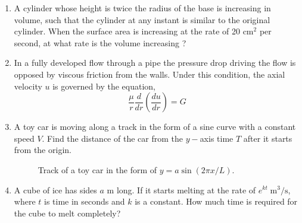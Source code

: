 \documentclass[a4paper,12pt]{article}
\begin{document}
\begin{enumerate}
 \item A cylinder whose height is twice the radius of the base is increasing in volume, such that the cylinder at any instant is similar to the original cylinder. When the surface area is increasing at the rate of 20 cm$^2$ per second, at what rate is the volume increasing ?
 \item In a fully developed flow through a pipe the pressure drop driving the flow is opposed by viscous friction from the walls. Under this condition, the axial velocity $u$ is governed by the equation,
   \[\frac{\mu}{r} \frac{d}{dr} \left( \frac{du}{dr}\right) = G\]
  
  \item A toy car is moving along a track in the form of a sine curve with a constant speed $V$. Find the distance of the car from the $y-$axis time $T$ after it starts from the origin.
  
 \begin{figure}[h]
 \begin{center}
\end{center}
 \caption{Track of a toy car in the form of $y = a\sin (2\pi x/L)$.}
\end{figure}

\item A cube of ice has sides $a$ m long. If it starts melting at the rate of  $e^{kt}\;\text{m}^3/\text{s}$, where $t$ is time in seconds and $k$ is a constant. How much time is required for the cube to melt completely?
\end{enumerate}
\end{document}
